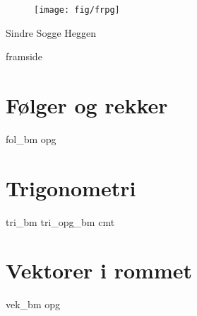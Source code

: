 



\renewcommand*\familydefault{\sfdefault} %

\addto\captionsenglish{\renewcommand{\figurename}{Figur}}
\makeatletter
\addto\captionsenglish{\renewcommand{\chaptername}{Kapittel}}
\addto\captionsenglish{\renewcommand{\contentsname}{Innhold}}



	
	\pagecolor{blue!20}
	
	\begin{titlepage}
		\begin{center}
			\vspace*{1cm}
			
			{}
			
			\vspace{2.45cm} 
			\begin{figure}[H]
				\centering
				\qquad\texttt{[image: fig/frpg]}
			\end{figure}           
			\vspace{2 cm}
			\raggedleft Sindre Sogge Heggen   \end{center}
	\end{titlepage}
	\pagecolor{white}
\newpage
\phantom{}
\thispagestyle{empty}	
\newpage	
{framside}
\newpage

\footnotesize
\tableofcontents
\normalsize
\chapter{Følger og rekker\label{Folgerogrekker}}
\vspace{20pt}
{fol_bm}
\newpage
{opg}

\chapter{Trigonometri\label{Trigonometri}}
\vspace{20pt}
{tri_bm}
\newpage
{tri_opg_bm}
\newpage
{cmt}

\chapter{Vektorer i rommet\label{Vektorerirommet}}
\vspace{20pt}
{vek_bm}
\newpage
{opg}

